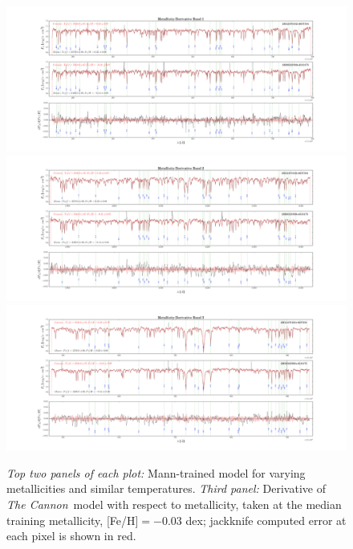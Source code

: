 \documentclass[modern]{aastex62}
\newcommand{\thecannon}{\textsl{The Cannon}}
\begin{document}
\begin{figure}[ht]
\begin{center}
\includegraphics[width=16cm]{figures/demo_derivatives_feh1.png}
\includegraphics[width=16cm]{figures/demo_derivatives_feh2.png}
\includegraphics[width=16cm]{figures/demo_derivatives_feh3.png}
\end{center}
\caption{\textit{Top two panels of each plot:} Mann-trained model for varying metallicities and similar temperatures. \textit{Third panel:} Derivative of \thecannon\ model with respect to metallicity, taken at the median training metallicity, [Fe/H]$=-0.03$ dex; jackknife computed error at each pixel is shown in red.} \label{fig:demo_feh}
\end{figure}
\end{document}
